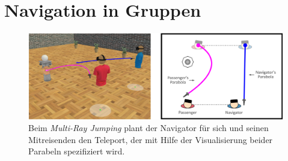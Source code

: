 \section{Navigation in Gruppen}
\begin{figure}[h]
  \centering
  \includegraphics[width=\textwidth]{images/multiray.png}
  \caption{Beim \textit{Multi-Ray Jumping} plant der Navigator für sich und seinen Mitreisenden den Teleport, der mit Hilfe der Visualisierung beider Parabeln spezifiziert wird.\cite{WeisskerMulti-RayReality}}
  \label{fig:todo}
\end{figure}

